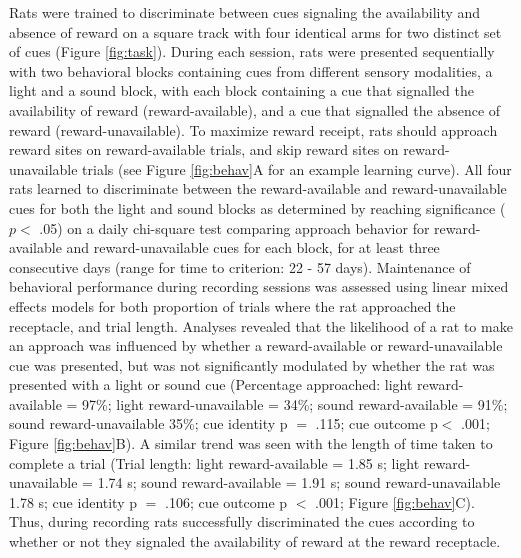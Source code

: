\documentclass[11pt]{article}
\providecommand{\DIFdel}[1]{} %
\providecommand{\DIFdelbegin}{} %
\providecommand{\DIFdelend}{} %
\newcommand{\DIFscaledelfig}{0.5}
\newlength{\DIFdelgraphicswidth} %
\newlength{\DIFdelgraphicsheight} %
\newcommand{\DIFdelincludegraphics}[2][]{%
\sbox{\DIFdelgraphicsbox}{\DIFOincludegraphics[#1]{#2}}%
\settoboxwidth{\DIFdelgraphicswidth}{\DIFdelgraphicsbox} %
\settoboxtotalheight{\DIFdelgraphicsheight}{\DIFdelgraphicsbox} %
\scalebox{\DIFscaledelfig}{%
\parbox[b]{\DIFdelgraphicswidth}{\usebox{\DIFdelgraphicsbox}\\[-\baselineskip] \rule{\DIFdelgraphicswidth}{0em}}\llap{\resizebox{\DIFdelgraphicswidth}{\DIFdelgraphicsheight}{%
\setlength{\unitlength}{\DIFdelgraphicswidth}%
\begin{picture}(1,1)%
\thicklines\linethickness{2pt} %
{\color[rgb]{1,0,0}\put(0,0){\framebox(1,1){}}}%
{\color[rgb]{1,0,0}\put(0,0){\line( 1,1){1}}}%
{\color[rgb]{1,0,0}\put(0,1){\line(1,-1){1}}}%
\end{picture}%
}\hspace*{3pt}}} %
} %
\DeclareRobustCommand{\DIFdelbegin}{\DIFOdelbegin \let\includegraphics\DIFdelincludegraphics} %
\DeclareRobustCommand{\DIFdelend}{\DIFOaddend \let\includegraphics\DIFOincludegraphics} %
\begin{document}
Rats were trained to discriminate between cues signaling the
availability and absence of reward on a square track with four
identical arms for two distinct set of cues (Figure
\ref{fig:task}). During each session, rats were presented sequentially
with two behavioral blocks containing cues from different sensory
modalities, a light and a sound block, with each block containing a
cue that signalled the availability of reward (reward-available), and
a cue that signalled the absence of reward (reward-unavailable). To
maximize reward receipt, rats should approach reward sites on
reward-available trials, and skip reward sites on reward-unavailable
trials (see Figure \ref{fig:behav}A for an example learning
curve). All four rats learned to discriminate between the
reward-available and reward-unavailable cues for both the light and
sound blocks as determined by reaching significance ($p <$ .05) on a
daily chi-square test comparing approach behavior for reward-available
and reward-unavailable cues for each block, for at least three
consecutive days (range for time to criterion: 22 - 57
days). Maintenance of behavioral performance during recording sessions
was assessed using linear mixed effects models for both proportion of
trials where the rat approached the receptacle, and trial
length. Analyses revealed that the likelihood of a rat to make an
approach was influenced by whether a reward-available or
reward-unavailable cue was presented, but was not significantly
modulated by whether the rat was presented with a light or sound cue
(Percentage approached: light reward-available = 97\%; light
reward-unavailable = 34\%; sound reward-available = 91\%; sound
reward-unavailable 35\%; cue identity p $=$ .115; cue outcome p$<$
.001; Figure \ref{fig:behav}B). A similar trend was seen with the
length of time taken to complete a trial (Trial length: light
reward-available = 1.85 s; light reward-unavailable = 1.74 s; sound
reward-available = 1.91 s; sound reward-unavailable 1.78 s; cue
identity p $=$ .106; cue outcome p $<$ .001; Figure
\ref{fig:behav}C). Thus, during recording \DIFdelbegin \DIFdel{, }\DIFdelend rats successfully
discriminated the cues according to whether or not they signaled the
availability of reward at the reward receptacle.
\end{document}
